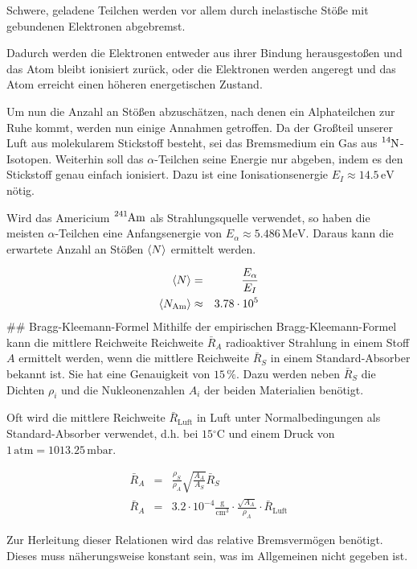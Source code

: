 \documentclass[12pt,a4paper]{scrartcl}
\numberwithin{equation}{section} %
\renewcommand{\[}{} %
\renewcommand{\]}{\noindent} %
\begin{document}
Schwere, geladene Teilchen werden vor allem durch inelastische Stöße mit
gebundenen Elektronen abgebremst.

Dadurch werden die Elektronen entweder aus ihrer Bindung herausgestoßen
und das Atom bleibt ionisiert zurück, oder die Elektronen werden
angeregt und das Atom erreicht einen höheren energetischen Zustand.

Um nun die Anzahl an Stößen abzuschätzen, nach denen ein Alphateilchen
zur Ruhe kommt, werden nun einige Annahmen getroffen. Da der Großteil
unserer Luft aus molekularem Stickstoff besteht, sei das Bremsmedium ein
Gas aus \(\ce{^{14}N}\)-Isotopen. Weiterhin soll das \(\alpha\)-Teilchen
seine Energie nur abgeben, indem es den Stickstoff genau einfach
ionisiert. Dazu ist eine Ionisationsenergie
\(E_I\approx 14.5 \mathrm{\,eV}\) nötig.

Wird das Americium \(\ce{^{241}Am}\) als Strahlungsquelle verwendet, so
haben die meisten \(\alpha\)-Teilchen eine Anfangsenergie von
\(E_\alpha\approx 5.486 \mathrm{\,MeV}\). Daraus kann die erwartete
Anzahl an Stößen \(\expval{N}\) ermittelt werden.

\[
\begin{eqnarray}
        \expval{N} &=& \frac{E_\alpha}{E_I} \\
    \expval{N_\mathrm{Am}} &\approx& 3.78 \cdot 10^5
\end{eqnarray}
\] \#\# Bragg-Kleemann-Formel Mithilfe der empirischen
Bragg-Kleemann-Formel kann die mittlere Reichweite Reichweite
\(\bar R_A\) radioaktiver Strahlung in einem Stoff \(A\) ermittelt
werden, wenn die mittlere Reichweite \(\bar R_S\) in einem
Standard-Absorber bekannt ist. Sie hat eine Genauigkeit von \(15\,\%\).
Dazu werden neben \(\bar R_S\) die Dichten \(\rho_i\) und die
Nukleonenzahlen \(A_i\) der beiden Materialien benötigt.

Oft wird die mittlere Reichweite \(\bar R_\mathrm{Luft}\) in Luft unter
Normalbedingungen als Standard-Absorber verwendet, d.h. bei
\(15\mathrm{^\circ C}\) und einem Druck von
\(1\mathrm{\,atm}=1013.25\mathrm{\,mbar}\).

\[
\begin{eqnarray}
        \bar R_A &=& \frac{\rho_S}{\rho_A}
                \sqrt{\frac{A_A}{A_S}} \bar R_S \\
        \bar R_A &=& 3.2\cdot 10^{-4} \mathrm{\frac{g}{cm^3}}
                \cdot\frac{\sqrt{A_A}}{\rho_A}\cdot \bar R_\mathrm{Luft}
\end{eqnarray}
\]

Zur Herleitung dieser Relationen wird das relative Bremsvermögen
benötigt. Dieses muss näherungsweise konstant sein, was im Allgemeinen
nicht gegeben ist.
\end{document}
